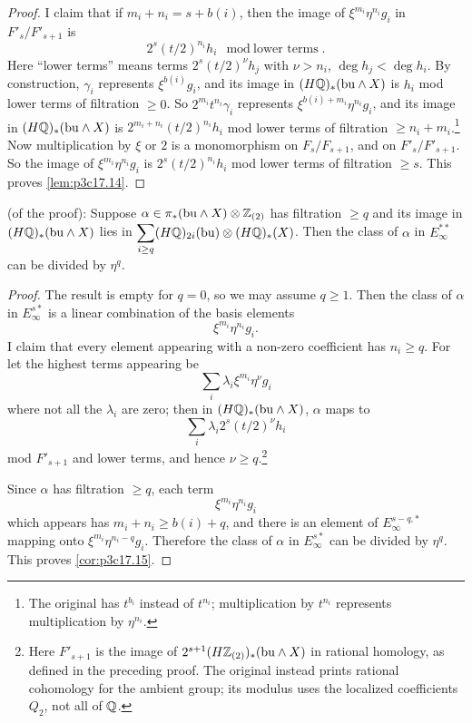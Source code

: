 \documentclass[../main]{subfiles}
\begin{document}
\begin{proof}
I claim that if $m_i+n_i=s+b(i)$, then the image of $\xi^{m_i}\eta^{n_i}g_i$ in $F'_s/F'_{s+1}$ is
\[2^s(t/2)^{n_i}h_i\mod\text{lower terms}.\]
Here ``lower terms'' means terms $2^s(t/2)^\nu h_j$ with $\nu>n_i$, $\deg h_j<\deg h_i$. By construction, $\gamma_i$ represents $\xi^{b(i)}g_i$, and its image in $(H\mathbb{Q})_\ast(\mathrm{bu}\wedge X)$ is $h_i$ mod lower terms of filtration $\ge0$. So $2^{m_i}t^{n_i}\gamma_i$ represents $\xi^{b(i)+m_i}\eta^{n_i}g_i$, and its image in $(H\mathbb{Q})_\ast(\mathrm{bu}\wedge X)$ is $2^{m_i+n_i}(t/2)^{n_i}h_i$ mod lower terms of filtration $\ge n_i+m_i$.\footnote{The original has $t^{b_i}$ instead of $t^{n_i}$; multiplication by $t^{n_i}$ represents multiplication by $\eta^{n_i}$.} Now multiplication by $\xi$ or $2$ is a monomorphism on $F_s/F_{s+1}$, and on $F'_s/F'_{s+1}$. So the image of $\xi^{m_i}\eta^{n_i}g_i$ is $2^s(t/2)^{n_i}h_i$ mod lower terms of filtration $\ge s$. This proves \ref{lem:p3c17.14}.
\end{proof}

\begin{corollary}
\label{cor:p3c17.15}
(of the proof): Suppose $\alpha \in \pi_\ast(\mathrm{bu} \wedge X) \otimes \mathbb{Z}_{(2)}$ has filtration $\ge q$ and its image in $(H\mathbb{Q})_\ast(\mathrm{bu} \wedge X)$ lies in $\displaystyle \sum_{i \ge q} (H \mathbb{Q})_{2i}(\mathrm{bu}) \otimes (H \mathbb{Q})_\ast(X)$. Then the class of $\alpha$ in $E_\infty^{\ast \ast}$ can be divided by $\eta^q$. 
\end{corollary}
\begin{proof}
The result is empty for $q=0$, so we may assume $q\ge1$. Then the class of $\alpha$ in $E_\infty^{s\ast}$ is a linear combination of the basis elements \[\xi^{m_i}\eta^{n_i}g_i.\] I claim that every element appearing with a non-zero coefficient has $n_i\ge q$. For let the highest terms appearing be \[\sum_i\lambda_i\xi^{m_i}\eta^\nu g_i\] where not all the $\lambda_i$ are zero; then in $(H\mathbb{Q})_\ast(\mathrm{bu}\wedge X)$, $\alpha$ maps to \[\sum_i\lambda_i2^s(t/2)^\nu h_i\] mod $F'_{s+1}$ and lower terms, and hence $\nu\ge q$.\footnote{Here $F'_{s+1}$ is the image of $2^{s+1}(H\mathbb{Z}_{(2)})_\ast(\mathrm{bu}\wedge X)$ in rational homology, as defined in the preceding proof. The original instead prints rational cohomology for the ambient group; its modulus uses the localized coefficients $Q_2$, not all of $\mathbb{Q}$.}

Since $\alpha$ has filtration $\ge q$, each term \[\xi^{m_i}\eta^{n_i}g_i\] which appears has $m_i+n_i\ge b(i)+q$, and there is an element of $E_\infty^{s-q,\ast}$ mapping onto $\xi^{m_i}\eta^{n_i-q}g_i$. Therefore the class of $\alpha$ in $E_\infty^{s\ast}$ can be divided by $\eta^q$. This proves \ref{cor:p3c17.15}.
\end{proof}
\end{document}
